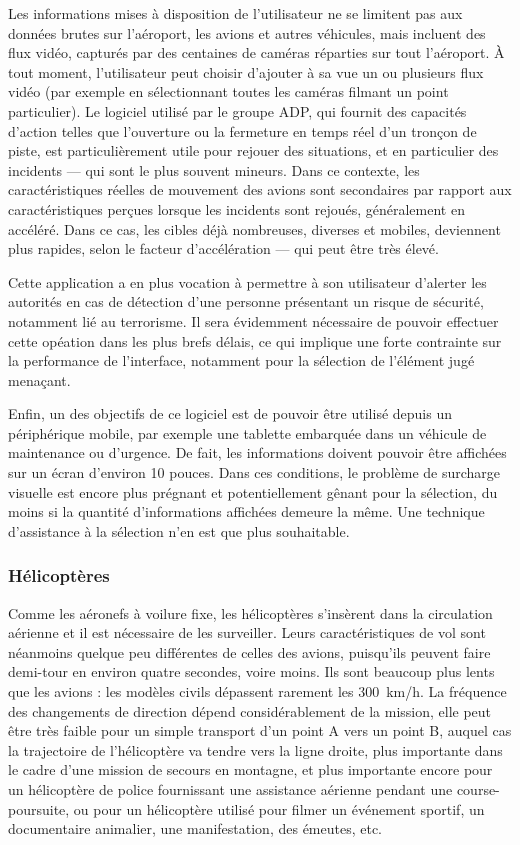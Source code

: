 	Les informations mises à disposition de l'utilisateur ne se limitent pas aux données brutes sur l'aéroport, les avions et autres véhicules, mais incluent des flux vidéo, capturés par des centaines de caméras réparties sur tout l'aéroport. À tout moment, l'utilisateur peut choisir d'ajouter à sa vue un ou plusieurs flux vidéo (par exemple en sélectionnant toutes les caméras filmant un point particulier). Le logiciel utilisé par le groupe ADP, qui fournit des capacités d'action telles que l'ouverture ou la fermeture en temps réel d'un tronçon de piste, est particulièrement utile pour rejouer des situations, et en particulier des incidents --- qui sont le plus souvent mineurs. Dans ce contexte, les caractéristiques réelles de mouvement des avions sont secondaires par rapport aux caractéristiques perçues lorsque les incidents sont rejoués, généralement en accéléré. Dans ce cas, les cibles déjà nombreuses, diverses et mobiles, deviennent plus rapides, selon le facteur d'accélération --- qui peut être très élevé.
	
	Cette application a en plus vocation à permettre à son utilisateur d'alerter les autorités en cas de détection d'une personne présentant un risque de sécurité, notamment lié au terrorisme. Il sera évidemment nécessaire de pouvoir effectuer cette opéation dans les plus brefs délais, ce qui implique une forte contrainte sur la performance de l'interface, notamment pour la sélection de l'élément jugé menaçant.
	
	Enfin, un des objectifs de ce logiciel est de pouvoir être utilisé depuis un périphérique mobile, par exemple une tablette embarquée dans un véhicule de maintenance ou d'urgence. De fait, les informations doivent pouvoir être affichées sur un écran d'environ 10 pouces. Dans ces conditions, le problème de surcharge visuelle est encore plus prégnant et potentiellement gênant pour la sélection, du moins si la quantité d'informations affichées demeure la même. Une technique d'assistance à la sélection n'en est que plus souhaitable.

	\subsubsection{Hélicoptères}
	Comme les aéronefs à voilure fixe, les hélicoptères s'insèrent dans la circulation aérienne et il est nécessaire de les surveiller. Leurs caractéristiques de vol sont néanmoins quelque peu différentes de celles des avions, puisqu'ils peuvent faire demi-tour en environ quatre secondes, voire moins. Ils sont beaucoup plus lents que les avions : les modèles civils dépassent rarement les 300~km/h. La fréquence des changements de direction dépend considérablement de la mission, elle peut être très faible pour un simple transport d'un point A vers un point B, auquel cas la trajectoire de l'hélicoptère va tendre vers la ligne droite, plus importante dans le cadre d'une mission de secours en montagne, et plus importante encore pour un hélicoptère de police fournissant une assistance aérienne pendant une course-poursuite, ou pour un hélicoptère utilisé pour filmer un événement sportif, un documentaire animalier, une manifestation, des émeutes, etc.
	
